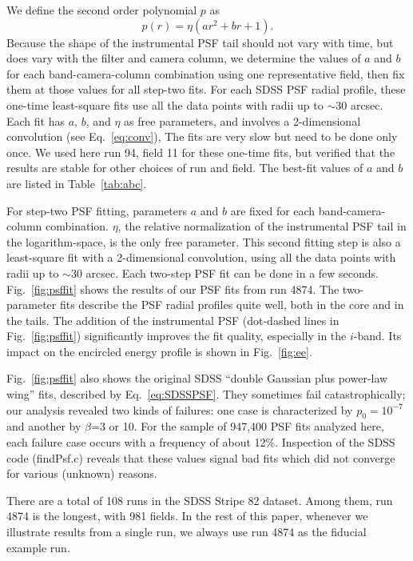 We define the second order polynomial $p$ as
\begin{equation}
        p(r) = \eta(ar^2+br+1).
\label{eq:psfinstp}
\end{equation} 
Because the shape of the instrumental PSF tail should not vary with
time, but does vary with the filter and camera column,
we determine the values of $a$ and $b$ for each band-camera-column
combination using one representative
field, then fix them at those values for all step-two fits.
For each SDSS PSF radial profile,
these one-time least-square fits use all the data points with radii up
to $\sim$30 arcsec.
Each fit has $a$, $b$, and $\eta$ as free parameters, and involves a 2-dimensional convolution (see Eq.~\ref{eq:conv}),
The fits are very slow but need to be done only once.
We used here run 94, field 11 for these one-time fits, but verified that 
the results are stable for other choices of run and field. 
The best-fit values of $a$ and $b$ are listed in Table~\ref{tab:abc}.

For step-two PSF fitting, parameters $a$ and $b$ are
fixed for each band-camera-column combination.
$\eta$, the relative normalization of the instrumental PSF
tail in the logarithm-space, is the only free
parameter.
This second fitting step is also a least-square fit with a
2-dimensional convolution, using all the data points
with radii up to $\sim$30 arcsec.
Each two-step PSF fit can be done in a few seconds.
Fig.~\ref{fig:psffit} shows the results of our PSF fits from run 4874. The two-parameter
fits describe the PSF radial profiles quite well, both in the core and
in the tails. The addition of the instrumental PSF 
(dot-dashed lines in Fig.~\ref{fig:psffit})
significantly improves the fit quality, 
especially in the $i$-band. 
Its impact on the encircled energy profile is shown in Fig.~\ref{fig:ee}.

Fig.~\ref{fig:psffit} also shows the original SDSS ``double Gaussian plus power-law wing'' fits,
described by Eq.~\ref{eq:SDSSPSF}. They sometimes fail catastrophically; our analysis revealed
two kinds of failures: one case is characterized by $p_0 =10^{-7}$ and
another by $\beta$=3 or 10.
For the sample of 947,400 PSF fits analyzed here, each failure case occurs with a frequency of about 12\%. 
Inspection of the SDSS code (findPsf.c) reveals that these values signal bad fits which did not 
converge for various (unknown) reasons. 

There are a total of 108 runs in the SDSS Stripe 82 dataset. Among them, run 4874 is the longest, 
with 981 fields. In the rest of this paper, whenever we illustrate results from a single run, 
we always use run 4874 as the fiducial example run. 




